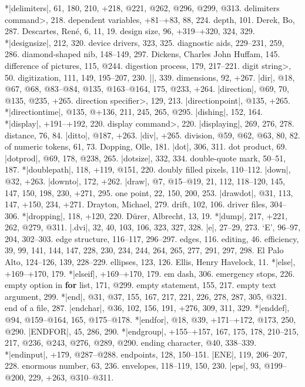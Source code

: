 *|delimiters|, 61, 180, 210, +218, @221, @262, @296, @299, @313.
\<delimiters command>, 218.
dependent variables, +81--+83, 88, 224.
depth, 101.
Derek, Bo, 287.
Descartes, Ren\'e, 6, 11, 19.
design size, 96, +319--+320, 324, 329.
*|designsize|, 212, 320.
device drivers, 323, 325.
diagnostic aids, 229--231, 259, 286.
diamond-shaped nib, 148--149, 297.
Dickens, Charles John Huffam, 145.
difference of pictures, 115, @244.
digestion process, 179, 217--221.
\<digit string>, 50.
digitization, 111, 149, 195--207, 230.
|\digits|, 339.
dimensions, 92, +267.
|dir|, @18, @67, @68, @83--@84, @135, @163--@164, 175, @233, +264.
|direction|, @69, 70, @135, @235, +265.
\<direction specifier>, 129, 213.
|directionpoint|, @135, +265.
*|directiontime|, @135, @+136, 211, 245, 265, @295.
|dishing|, 152, 164.
*|display|, +191--+192, 220.
\<display command>, 220.
|displaying|, 269, 276, 278.
distance, 76, 84.
|ditto|, @187, +263.
|div|, +265.
division, @59, @62, @63, 80, 82.
\sub of numeric tokens, 61, 73.
Dopping, Olle, 181.
|dot|, 306, 311.
dot product, 69.
|dotprod|, @69, 178, @238, 265.
|dotsize|, 332, 334.
double-quote mark, 50--51, 187.
*|doublepath|, 118, +119, @151, 220.
doubly filled pixels, 110--112.
|down|, @32, +263.
|downto|, 172, +262.
|draw|, @7, @15--@19, 21, 112, 118--120, 145, 147, 150, 198, 230, +271, 295.
\sub one point, 22, 150, 200, 253.
|drawdot|, @31, 113, 147, +150, 234, +271.
Drayton, Michael, 279.
drift, 102, 106.
driver files, 304--306.
*|dropping|, 118, +120, 220.
D\"urer, Albrecht, 13, 19.
*|dump|, 217, +221, 262, @279, @311.
|.dvi|, 32, 40, 103, 106, 323, 327, 328.
\newletter
|e|, 27--29, 273.
`E', 96--97, 204, 302--303.
edge structure, 116--117, 296--297.
edges, 116.
editing, 46.
efficiency, 39, 99, 141, 144, 147, 228, 230, 234, 244, 264, 265, 277,
 291, 297, 298.
El Palo Alto, 124--126, 139, 228--229.
ellipses, 123, 126.
Ellis, Henry Havelock, 11.
*|else|, +169--+170, 179.
*|elseif|, +169--+170, 179.
em dash, 306.
emergency stops, 226.
empty option in {\bf for\/} list, 171, @299.
empty statement, 155, 217.
empty text argument, 299.
*|end|, @31, @37, 155, 167, 217, 221, 226, 278, 287, 305, @321.
end of a file, 287.
|endchar|, @36, 102, 156, 191, +276, 309, 311, 329.
*|enddef|, @94, @159--@164, 165, @175--@178.
*|endfor|, @18, @39, +171--+172, @173, 250, @290.
|ENDFOR|, 45, 286, 290.
*|endgroup|, +155--+157, 167, 175, 178, 210--215, 217, @236, @243,
 @276, @289, @290.
ending character, @40, 338--339.
*|endinput|, +179, @287--@288.
endpoints, 128, 150--151.
|ENE|, 119, 206--207, 228.
enormous number, 63, 236.
envelopes, 118--119, 150, 230.
|eps|, 93, @199--@200, 229, +263, @310--@311.
